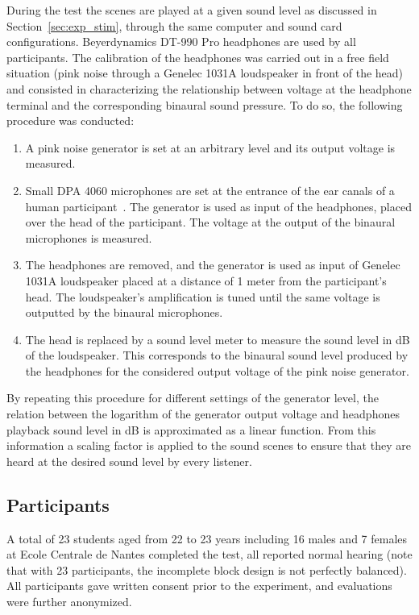 \documentclass[twocolumn]{article}
\begin{document}
During the test the scenes are played at a given sound level as discussed in Section~\ref{sec:exp_stim}, through the same computer and sound card configurations. Beyerdynamics DT-990 Pro headphones are used by all participants. The calibration of the headphones was carried out in a free field situation (pink noise through a Genelec 1031A loudspeaker in front of the head) and consisted in characterizing the relationship between voltage at the headphone terminal and the corresponding binaural sound pressure. To do so, the following procedure was conducted:
\begin{enumerate}
\item A pink noise generator is set at an arbitrary level and its output voltage is measured.
\item Small DPA 4060 microphones are set at the entrance of the ear canals of a human participant~\cite{moller1992}. The generator is used as input of the headphones, placed over the head of the participant. The voltage at the output of the binaural microphones is measured.
\item The headphones are removed, and the generator is used as input of Genelec 1031A loudspeaker placed at a distance of 1 meter from the participant's head. The loudspeaker's amplification is tuned until the same voltage is outputted by the binaural microphones.
\item The head is replaced by a sound level meter to measure the sound level in dB of the loudspeaker. This corresponds to the binaural sound level produced by the headphones for the considered output voltage of the pink noise generator.
\end{enumerate}
By repeating this procedure for different settings of the generator level, the relation between the logarithm of the generator output voltage and headphones playback sound level in dB is approximated as a linear function. From this information a scaling factor is applied to the sound scenes to ensure that they are heard at the desired sound level by every listener.

\subsection{Participants}
\label{sec:exp_part}

A total of 23 students aged from 22 to 23 years including 16 males and 7 females at Ecole Centrale de Nantes completed the test, all reported normal hearing (note that with 23 participants, the incomplete block design is not perfectly balanced). All participants gave written consent prior to the experiment, and evaluations were further anonymized.
\end{document}
